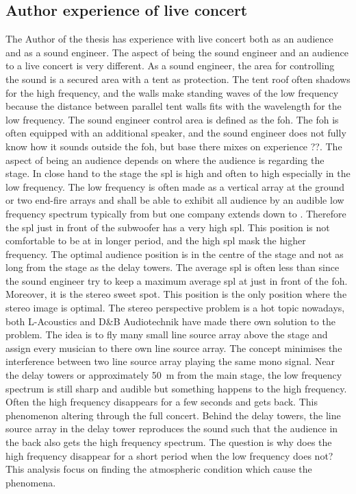 \subsection{Author experience of live concert}\label{sec:ana:aut_exp_con}
The Author of the thesis has experience with live concert both as an audience and as a sound engineer. The aspect of being the sound engineer and an audience to a live concert is very different. As a sound engineer, the area for controlling the sound is a secured area with a tent as protection. The tent roof often shadows for the high frequency, and the walls make standing waves of the low frequency because the distance between parallel tent walls fits with the wavelength for the low frequency. The sound engineer control area is defined as the \gls{foh}. The \gls{foh} is often equipped with an additional speaker, and the sound engineer does not fully know how it sounds outside the \gls{foh}, but base there mixes on experience ??. The aspect of being an audience depends on where the audience is regarding the stage. In close hand to the stage the \gls{spl} is high and often to high especially in the low frequency. The low frequency is often made as a vertical array at the ground or two end-fire arrays and shall be able to exhibit all audience by an audible low frequency spectrum typically from  but one company extends down to . Therefore the \gls{spl} just in front of the subwoofer has a very high \gls{spl}. This position is not comfortable to be at in longer period, and the high \gls{spl} mask the higher frequency. The optimal audience position is in the centre of the stage and not as long from the stage as the delay towers. The average \gls{spl} is often less than  since the sound engineer try to keep a maximum average \gls{spl} at  just in front of the \gls{foh}. Moreover, it is the stereo sweet spot. This position is the only position where the stereo image is optimal. The stereo perspective problem is a hot topic nowadays, both L-Acoustics \citep{l_acoustics_l_isa} and D\&B Audiotechnik \citep{dbsoundscape} have made there own solution to the problem. The idea is to fly many small line source array above the stage and assign every musician to there own line source array. The concept minimises the interference between two line source array playing the same mono signal. 
Near the delay towers or approximately \SI{50}{\meter} from the main stage, the low frequency spectrum is still sharp and audible but something happens to the high frequency. Often the high frequency disappears for a few seconds and gets back. This phenomenon altering through the full concert. Behind the delay towers, the line source array in the delay tower reproduces the sound such that the audience in the back also gets the high frequency spectrum. The question is why does the high frequency disappear for a short period when the low frequency does not? This analysis focus on finding the atmospheric condition which cause the phenomena.

 
